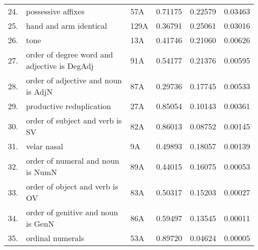 \begin{tabular}{rllrrr}
24. & possessive affixes & 57A & 0.71175 & 0.22579 & 0.03463 \\
25. & hand and arm identical & 129A & 0.36791 & 0.25061 & 0.03016 \\
26. & tone & 13A & 0.41746 & 0.21060 & 0.00626 \\
27. & order of degree word and adjective is DegAdj & 91A & 0.54177 & 0.21376 & 0.00595 \\
28. & order of adjective and noun is AdjN & 87A & 0.29736 & 0.17745 & 0.00533 \\
29. & productive reduplication & 27A & 0.85054 & 0.10143 & 0.00361 \\
30. & order of subject and verb is SV & 82A & 0.86013 & 0.08752 & 0.00145 \\
31. & velar nasal & 9A & 0.49893 & 0.18057 & 0.00139 \\
32. & order of numeral and noun is NumN & 89A & 0.44015 & 0.16075 & 0.00053 \\
33. & order of object and verb is OV & 83A & 0.50317 & 0.15203 & 0.00027 \\
34. & order of genitive and noun is GenN & 86A & 0.59497 & 0.13545 & 0.00011 \\
35. & ordinal numerals & 53A & 0.89720 & 0.04624 & 0.00005 \\
\hline
\end{tabular}
